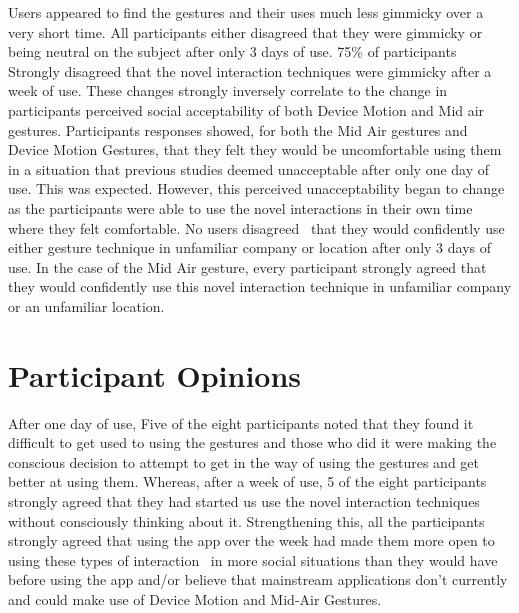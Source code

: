 \documentclass{l4proj}
\begin{document}
Users appeared to find the gestures and their uses much less gimmicky over a very short time. All participants either disagreed that they were gimmicky or being neutral on the subject after only 3 days of use. 75\% of participants Strongly disagreed that the novel interaction techniques were gimmicky after a week of use. These changes strongly inversely correlate to the change in participants perceived social acceptability of both Device Motion and Mid air gestures. Participants responses showed, for both the Mid Air gestures and Device Motion Gestures, that they felt they would be uncomfortable using them in a situation that previous studies deemed unacceptable after only one day of use. This was expected. However, this perceived unacceptability began to change as the participants were able to use the novel interactions in their own time where they felt comfortable. No users disagreed  that they would confidently use either gesture technique in unfamiliar company or location after only 3 days of use. In the case of the Mid Air gesture, every participant strongly agreed that they would confidently use this novel interaction technique in unfamiliar company or an unfamiliar location. 


\section{Participant Opinions}
After one day of use, Five of the eight participants noted that they found it difficult to get used to using the gestures and those who did it were making the conscious decision to attempt to get in the way of using the gestures and get better at using them. Whereas, after a week of use, 5 of the eight participants strongly agreed that they had started us use the novel interaction techniques without consciously thinking about it. Strengthening this, all the participants strongly agreed that using the app over the week had made them more open to using these types of interaction  in more social situations than they would have before using the app and/or believe that mainstream applications don't currently and could make use of Device Motion and Mid-Air Gestures.
\end{document}
